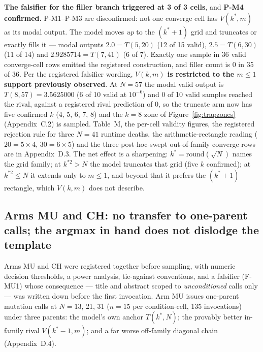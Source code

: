 \textbf{The falsifier for the filler branch triggered at 3 of 3 cells}, and \textbf{P-M4 confirmed.}
P-M1--P-M3 are disconfirmed: not one converge cell has $V(k^*, m)$ as its modal output. The model
moves \emph{up} to the $(k^*{+}1)$ grid and truncates or exactly fills it --- modal outputs
$2.0 = T(5,20)$ (12 of 15 valid), $2.5 = T(6,30)$ (11 of 14) and $2.9285714 = T(7,41)$ (6 of 7).
Exactly one sample in 36 valid converge-cell rows emitted the registered construction, and filler
count is 0 in 35 of 36. Per the registered falsifier wording, \textbf{$V(k, m)$ is restricted to the
$m \le 1$ support previously observed}. At $N = 57$ the modal valid output is $T(8,57) = 3.5625000$
(6 of 10 valid at $10^{-6}$) and 0 of 10 valid samples reached the rival, against a registered rival
prediction of 0, so the truncate arm now has five confirmed $k$ (4, 5, 6, 7, 8) and the $k = 8$ zone of
Figure~\ref{fig:trapzones} (Appendix~C.2) is sampled. Table~M, the per-cell validity figures, the registered rejection rule for
three $N = 41$ runtime deaths, the arithmetic-rectangle reading ($20 = 5 \times 4$,
$30 = 6 \times 5$) and the three post-hoc-swept out-of-family converge rows are in Appendix~D.3. The
net effect is a sharpening: $k^* = \mathrm{round}(\sqrt{N})$ names the grid family; at $k^{*2} > N$
the model truncates that grid (five $k$ confirmed); at $k^{*2} \le N$ it extends only to $m \le 1$,
and beyond that it prefers the $(k^*{+}1)$ rectangle, which $V(k, m)$ does not describe.

\subsection{Arms MU and CH: no transfer to one-parent calls; the argmax in hand does not dislodge the template}

Arms MU and CH were registered together before sampling, with numeric decision thresholds, a power
analysis, tie-against conventions, and a falsifier (F-MU1) whose consequence --- title and abstract
scoped to \emph{unconditioned} calls only --- was written down before the first invocation. Arm MU
issues one-parent mutation calls at $N = 13$, 21, 31 ($n = 15$ per condition-cell, 135 invocations)
under three parents: the model's own anchor $T(k^*, N)$; the provably better in-family rival
$V(k^*{-}1, m)$; and a far worse off-family diagonal chain (Appendix~D.4).

